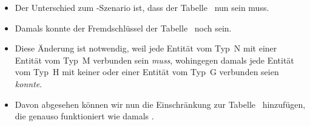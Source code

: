 \begin{frame}
{\begin{itemize}
{}%
%
%
%
\item<18-> Der Unterschied zum -Szenario ist, dass  der Tabelle~ nun  sein muss.%
%
\item<19-> Damals konnte der Fremdschlüssel  der Tabelle~ noch  sein.%
%
\item<20-> Diese Änderung ist notwendig, weil jede Entität vom Typ~N mit einer Entität vom Typ~M verbunden sein \emph{muss}, wohingegen damals jede Entität vom Typ~H mit keiner oder einer Entität vom Typ~G verbunden seien \emph{konnte}.
%
\item<21-> Davon abgesehen können wir nun die Einschränkung  zur Tabelle~ hinzufügen, die genauso funktioniert wie damals .%
%
\end{itemize}%
}%
%
\end{frame}%
%
%
